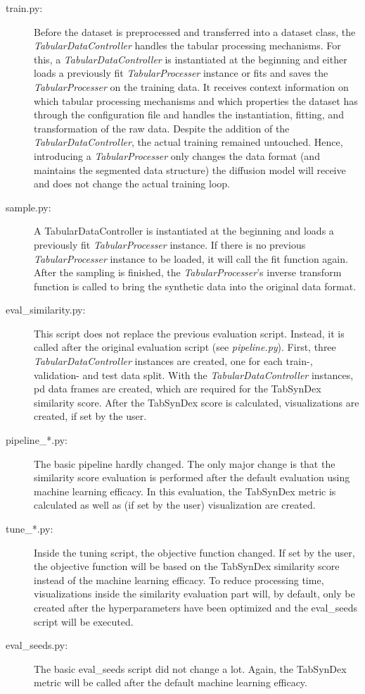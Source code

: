\begin{description}
	\item[train.py:]
		Before the dataset is preprocessed and transferred into a dataset class, the \textit{TabularDataController} handles the tabular processing mechanisms.
		For this, a \textit{TabularDataController} is instantiated at the beginning and either loads a previously fit \textit{TabularProcesser} instance or fits and saves the \textit{TabularProcesser} on the training data.
		It receives context information on which tabular processing mechanisms and which properties the dataset has through the configuration file and handles the
		instantiation, fitting, and transformation of the raw data.
		Despite the addition of the \textit{TabularDataController}, the actual training remained untouched.
		Hence, introducing a \textit{TabularProcesser} only changes the data format (and maintains the segmented data structure) the diffusion model will receive and does not change the actual training loop.

	\item[sample.py:]
		A TabularDataController is instantiated at the beginning and loads a previously fit \textit{TabularProcesser} instance.
		If there is no previous \textit{TabularProcesser} instance to be loaded, it will call the fit function again.
		After the sampling is finished, the \textit{TabularProcesser}'s inverse transform function is called to bring the synthetic data into the original data format.

	\item[eval\_similarity.py:]
		This script does not replace the previous evaluation script.
		Instead, it is called after the original evaluation script (see \textit{pipeline.py}).
		First, three \textit{TabularDataController} instances are created, one for each train-, validation- and test data split.
		With the \textit{TabularDataController} instances, \gls{pd} \cite{mckinney-proc-scipy-2010} data frames are created, which are required for the TabSynDex similarity score.
		After the TabSynDex score is calculated, visualizations are created, if set by the user.
	\newpage
	\item[pipeline\_*.py:]
		The basic pipeline hardly changed.
		The only major change is that the similarity score evaluation is performed after the default evaluation using machine learning efficacy.
		In this evaluation, the TabSynDex metric is calculated as well as (if set by the user) visualization are created.

	\item[tune\_*.py:]
		Inside the tuning script, the objective function changed.
		If set by the user, the objective function will be based on the TabSynDex similarity score instead of the machine learning efficacy.
		To reduce processing time, visualizations inside the similarity evaluation part will, by default, only be created after the hyperparameters have been optimized and the eval\_seeds script will be executed.

	\item[eval\_seeds.py:]
		The basic eval\_seeds script did not change a lot.
		Again, the TabSynDex metric will be called after the default machine learning efficacy.
\end{description}

